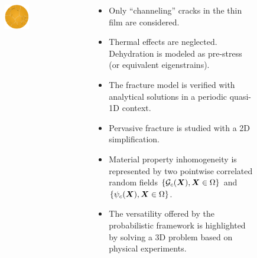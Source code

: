 \begin{frame}
\begin{columns}[T]
\begin{column}{0.6\textwidth}
\begin{figure}
\begin{subfigure}{0.32\textwidth}
          \includegraphics[width=0.8\textwidth]{Chapter345/figures/16mm_top.png}
        \end{subfigure}
      \end{figure}
    \end{column}
    \begin{column}{0.4\textwidth}
      \begin{itemize}
        \item Only \textcolor{peggyblue}{``channeling'' cracks} in the thin film are considered.
        \item Thermal effects are neglected. Dehydration is modeled as \textcolor{peggyblue}{pre-stress} (or equivalent eigenstrains).
        \item The fracture model is verified with analytical solutions in a periodic \textcolor{peggyblue}{quasi-1D} context.
        \item Pervasive fracture is studied with a \textcolor{peggyblue}{2D} simplification.
        \item Material property \textcolor{peggyblue}{inhomogeneity} is represented by two pointwise correlated random fields $\{{\mathcal{G}_c}(\boldsymbol{X}), \boldsymbol{X} \in \Omega\}$ and $\{\psi_c(\boldsymbol{X}), \boldsymbol{X} \in \Omega\}$.
        \item The versatility offered by the probabilistic framework is highlighted by solving a \textcolor{peggyblue}{3D} problem based on \textcolor{peggyblue}{physical experiments}.
      \end{itemize}
    \end{column}
  \end{columns}
\end{frame}

